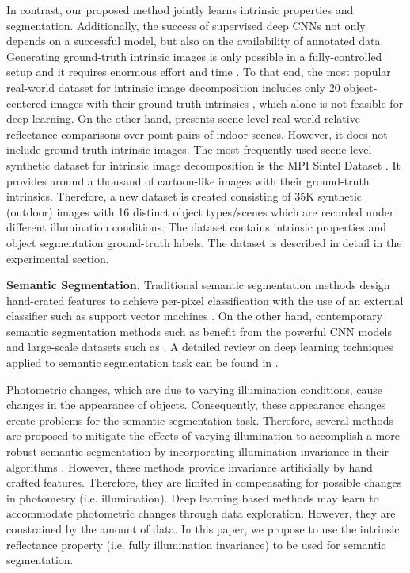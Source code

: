 \documentclass[runningheads]{llncs}
\begin{document}
In contrast, our proposed method jointly learns intrinsic properties and segmentation. Additionally, the success of supervised deep CNNs not only depends on a successful model, but also on the availability of annotated data. Generating ground-truth intrinsic images is only possible in a fully-controlled setup and it requires enormous effort and time \cite{mit}. To that end, the most popular real-world dataset for intrinsic image decomposition includes only 20 object-centered images with their ground-truth intrinsics \cite{mit}, which alone is not feasible for deep learning. On the other hand, \cite{iiw} presents scene-level real world relative reflectance comparisons over point pairs of indoor scenes. However, it does not include ground-truth intrinsic images. The most frequently used scene-level synthetic dataset for intrinsic image decomposition is the MPI Sintel Dataset \cite{sintel}. It provides around a thousand of cartoon-like images with their ground-truth intrinsics. 
Therefore, a new dataset is created consisting of 35K synthetic (outdoor) images with 16 distinct object types/scenes which are recorded under different illumination conditions. The dataset contains intrinsic properties and object segmentation ground-truth labels. The dataset is described in detail in the experimental section.

\noindent \textbf{Semantic Segmentation.}
Traditional semantic segmentation methods design hand-crated features to achieve per-pixel classification with the use of an external classifier such as support vector machines \cite{fulkerson,csurka,shotton}. On the other hand, contemporary semantic segmentation methods such as \cite{segnet,fcnn,deeplab} benefit from the powerful CNN models and large-scale datasets such as \cite{pascal,cityscape}. A detailed review on deep learning techniques applied to semantic segmentation task can be found in \cite{garcia}. 

Photometric changes, which are due to varying illumination conditions, cause changes in the appearance of objects. Consequently, these appearance changes create problems for the semantic segmentation task. Therefore, several methods are proposed to mitigate the effects of varying illumination to accomplish a more robust semantic segmentation by incorporating illumination invariance in their algorithms \cite{upcroft,wang,suh,ramakrishnan}. However, these methods provide invariance artificially by hand crafted features. Therefore, they are limited in compensating for possible changes in photometry (i.e. illumination). Deep learning based methods may learn to accommodate photometric changes through data exploration. However, they are constrained by the amount of data. In this paper, we propose to use the intrinsic reflectance property (i.e. fully illumination invariance) to be used for semantic segmentation.
\end{document}
